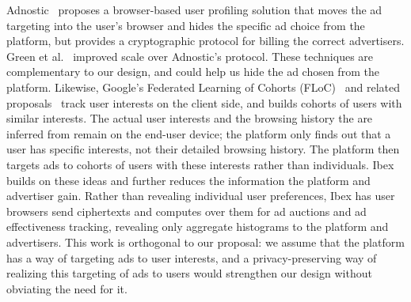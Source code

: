 %
Adnostic~\cite{adnostic} proposes a browser-based user profiling
solution that moves the ad targeting into the user's browser and hides the
specific ad choice from the platform, but provides a cryptographic protocol for
billing the correct advertisers.
%
Green et al.~\cite{adnostic+} improved scale over Adnostic's protocol.
%
These techniques are complementary to our design, and could help us hide the
ad chosen from the platform.
%
Likewise, Google's Federated Learning of Cohorts (FLoC)~\cite{google-floc} and
related proposals~\cite{google-topic-based} track user interests
on the client side, and builds cohorts of users with similar interests.
%
The actual user interests and the browsing history the are inferred from remain
on the end-user device; the platform only finds out that a user has specific
interests, not their detailed browsing history.
%
The platform then targets ads to cohorts of users with these interests rather
than individuals.
%
Ibex~\cite{ibex} builds on these ideas and further reduces the information the platform
and advertiser gain.
%
Rather than revealing individual user preferences, Ibex has user browsers send
ciphertexts and computes over them for ad auctions and ad effectiveness tracking,
revealing only aggregate histograms to the platform and advertisers.
%
This work is orthogonal to our proposal: we assume that the platform has a way
of targeting ads to user interests, and a privacy-preserving way of realizing this
targeting of ads to users would strengthen our design without obviating the need for it.
%

